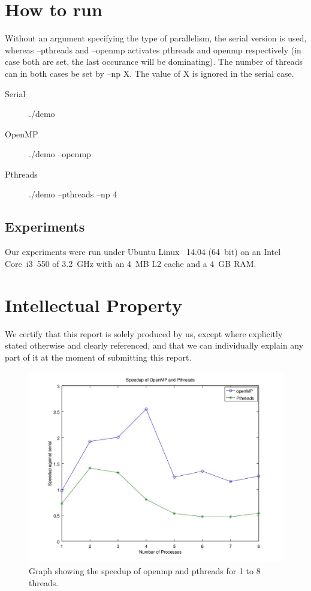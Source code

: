 \documentclass[a4paper,11pt]{article}
\begin{document}
\section{How to run}
Without an argument specifying the type of parallelism, the serial version is used, whereas --pthreads and --openmp activates pthreads and openmp respectively (in case both are set, the last occurance will be dominating). The number of threads can in both cases be set by --np X. The value of X is ignored in the serial case.
\begin{description}
    \item[Serial] ./demo
    \item[OpenMP] ./demo --openmp
    \item[Pthreads] ./demo --pthreads --np 4
\end{description}
   
\subsection{Experiments}
Our experiments were run under Ubuntu Linux ~14.04 (64~bit) on an
Intel Core~i3~550 of 3.2~GHz with an 4~MB L2 cache and a 4~GB RAM.



\section*{Intellectual Property}
We certify that this report is solely produced by us, except where
explicitly stated otherwise and clearly referenced, and that we can
individually explain any part of it at the moment of submitting this
report.


\begin{figure}[h!]
\includegraphics[width=\textwidth]{graph.jpg}
\caption{Graph showing the speedup of openmp and pthreads for 1 to 8 threads.}
\label{figure1}
\end{figure}
\end{document}
